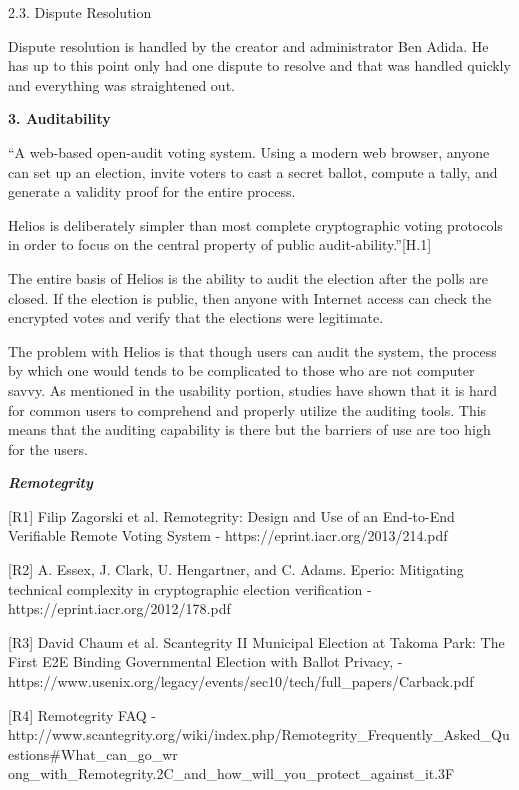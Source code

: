 2.3. Dispute Resolution

Dispute resolution is handled by the creator and administrator Ben Adida. He has up to this point only had one dispute to resolve and that was handled quickly and everything was straightened out.

\textbf{3. Auditability}

``A web-based open-audit voting system. Using a modern web browser, anyone can set up an election, invite voters to cast a secret ballot, compute a tally, and generate a validity proof for the entire process.

Helios is deliberately simpler than most complete cryptographic voting protocols in order to focus on the central property of public audit-ability.''[H.1]

The entire basis of Helios is the ability to audit the election after the polls are closed. If the election is public, then anyone with Internet access can check the encrypted votes and verify that the elections were legitimate.

The problem with Helios is that though users can audit the system, the process by which one would tends to be complicated to those who are not computer savvy. As mentioned in the usability portion, studies have shown that it is hard for common users to comprehend and properly utilize the auditing tools. This means that the auditing capability is there but the barriers of use are too high for the users.


\bigskip


\bigskip

\textbf{\textit{Remotegrity}}

[R1] Filip Zagorski et al. Remotegrity: Design and Use of an End-to-End Verifiable Remote Voting System - \textcolor[rgb]{0.078431375,0.3254902,0.6901961}{https://eprint.iacr.org/2013/214.pdf}

[R2] A. Essex, J. Clark, U. Hengartner, and C. Adams. Eperio: Mitigating technical complexity in cryptographic election verification - \textcolor[rgb]{0.078431375,0.3254902,0.6901961}{https://eprint.iacr.org/2012/178.pdf}

[R3] David Chaum et al. Scantegrity II Municipal Election at Takoma Park: The First E2E Binding Governmental Election with Ballot Privacy, - \textcolor[rgb]{0.078431375,0.3254902,0.6901961}{https://www.usenix.org/legacy/events/sec10/tech/full\_papers/Carback.pdf}

[R4] Remotegrity FAQ -\textcolor[rgb]{0.078431375,0.3254902,0.6901961}{http://www.scantegrity.org/wiki/index.php/Remotegrity\_Frequently\_Asked\_Questions\#What\_can\_go\_wr ong\_with\_Remotegrity.2C\_and\_how\_will\_you\_protect\_against\_it.3F}


